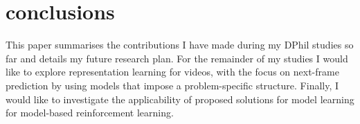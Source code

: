 \section{conclusions}
\label{sec:conclusions}

    This paper summarises the contributions I have made during my DPhil studies so far and details my future research plan. For the remainder of my studies I would like to explore representation learning for videos, with the focus on next-frame prediction by using models that impose a problem-specific structure. Finally, I would like to investigate the applicability of proposed solutions for model learning for model-based reinforcement learning.